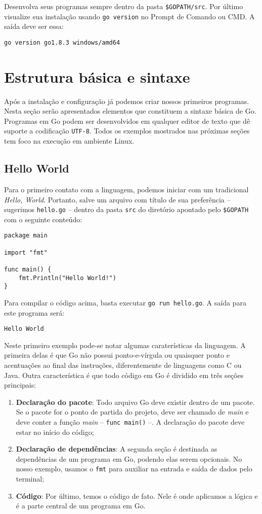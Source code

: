\documentclass{SBCbookchapter}
\begin{document}
Desenvolva seus programas sempre dentro da pasta \texttt{\$GOPATH/src}. Por último visualize sua instalação usando \texttt{go version} no Prompt de Comando ou CMD. A saída deve ser essa:

\noindent\texttt{go version go1.8.3 windows/amd64}

\section{Estrutura básica e sintaxe}

Após a instalação e configuração já podemos criar nossos primeiros programas. Nesta seção serão apresentados elementos que constituem a sintaxe básica de Go. Programas em Go podem ser desenvolvidos em qualquer editor de texto que dê suporte a codificação \texttt{UTF-8}. Todos os exemplos mostrados nas próximas seções tem foco na execução em ambiente Linux.

\subsection{Hello World}

Para o primeiro contato com a linguagem, podemos iniciar com um tradicional \textit{Hello, World}. Portanto, salve um arquivo com título de sua preferência -- sugerimos \texttt{hello.go} -- dentro da pasta \texttt{src} do diretório apontado pelo \texttt{\$GOPATH} com o seguinte conteúdo:

\begin{lstlisting}
package main

import "fmt"

func main() {
    fmt.Println("Hello World!")
}
\end{lstlisting}

Para compilar o código acima, basta executar \texttt{go run hello.go}. A saída para este programa será:

\texttt{Hello World}

Neste primeiro exemplo pode-se notar algumas caraterísticas da linguagem. A primeira delas é que Go não possui ponto-e-vírgula ou quaisquer ponto e acentuações ao final das instruções, diferentemente de linguagens como C ou Java. Outra característica é que todo código em Go é dividido em três seções principais: 

\begin{enumerate}
	\item \textbf{Declaração do pacote}: Todo arquivo Go deve existir dentro de um pacote. Se o pacote for o ponto de partida do projeto, deve ser chamado de \textit{main} e deve conter a função \textit{main} -- \texttt{func main()} --. A declaração do pacote deve estar no início do código;
	\item \textbf{Declaração de dependências}: A segunda seção é destinada as dependências de um programa em Go, podendo elas serem opcionais. No nosso exemplo, usamos o \texttt{fmt} para auxiliar na entrada e saída de dados pelo terminal;
	\item \textbf{Código}: Por último, temos o código de fato. Nele é onde aplicamos a lógica e é a parte central de um programa em Go.
\end{enumerate}
\end{document}
